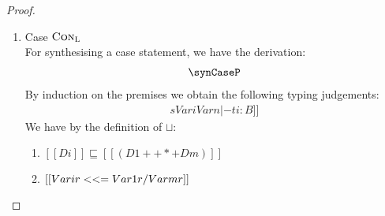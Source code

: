 \begin{proof}
\begin{enumerate}
\begin{enumerate}
\item Case $\textsc{Con}_{\textsc{L}}$ \\
        For synthesising a case statement, we have the derivation:
        \begin{align*}
          \synCaseP
        \end{align*}
        By induction on the premises we obtain the following typing judgements:
        \begin{align*}
          [[  Sig; {{Di, x : [K {A Many}] {ri}}, {y Vari Var1} : [B1] {s Vari Var1} } , .M. , {y Vari Varn} : [Bn] {s Vari Varn} |- ti : B ]] \tag{ih}
        \end{align*}
        We have by the definition of $\sqcup$:
        \begin{enumerate}
                \item $ [[ Di]] \sqsubseteq [[(D1 ++*+ Dm) ]]$
                \item $ [[ {Vari r} <<= {{Var1 r} \*/ {Varm r}}  ]]$
        \end{enumerate}


\end{enumerate}
\end{enumerate}
\end{proof}
